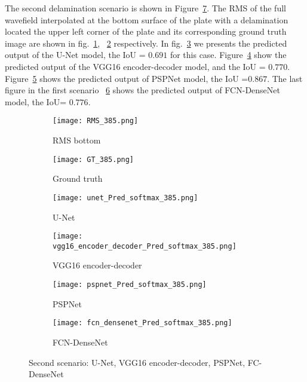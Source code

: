 The second delamination scenario is shown in Figure~\ref{fig:385_softmax}. 
The RMS of the full wavefield interpolated at the bottom surface of the plate with a delamination located the upper left corner of the plate and its corresponding ground truth image are shown in fig.~\ref{fig:RMS_flat_shell_Vz_385}, ~\ref{fig:m1_rand_single_delam_385} respectively. 
In fig.~\ref{fig:Unet_Pred__softmax_385} we presents the predicted output of the U-Net model, the IoU = \(0.691\) for this case.
Figure~\ref{fig:vgg16_pred__softmax_385} show the predicted output of the VGG16 encoder-decoder model, and the IoU = \(0.770\). 
Figure~\ref{fig:pspnet_pred__softmax_385} shows the predicted output of PSPNet model, the IoU =\(0.867\).
The last figure in the first scenario ~\ref{fig:fcn_densenet_pred__softmax_385}	shows the predicted output of FCN-DenseNet model, the IoU= \(0.776\).
\begin{figure}[!h]
	\centering
	\begin{subfigure}[b]{0.47\textwidth}
		\centering
		\texttt{[image: RMS\_385.png]}
		\caption{RMS bottom}
		\label{fig:RMS_flat_shell_Vz_385}
	\end{subfigure}
	\hfill
	\begin{subfigure}[b]{0.47\textwidth}
		\centering
		\texttt{[image: GT\_385.png]}
		\caption{Ground truth}
		\label{fig:m1_rand_single_delam_385}
	\end{subfigure}
	\begin{subfigure}[b]{0.47\textwidth}
		\centering
		\texttt{[image: unet\_Pred\_softmax\_385.png]}
		\caption{U-Net}
		\label{fig:Unet_Pred__softmax_385}
	\end{subfigure}
	\hfill
	\begin{subfigure}[b]{0.47\textwidth}
		\centering
		\texttt{[image: vgg16\_encoder\_decoder\_Pred\_softmax\_385.png]}
		\caption{VGG16 encoder-decoder}			\label{fig:vgg16_pred__softmax_385}			
	\end{subfigure}
	\hfill
	\begin{subfigure}[b]{0.47\textwidth}
		\centering
		\texttt{[image: pspnet\_Pred\_softmax\_385.png]}
		\caption{PSPNet}
		\label{fig:pspnet_pred__softmax_385}
	\end{subfigure}	
	\hfill
	\begin{subfigure}[b]{0.47\textwidth}
		\centering
		\texttt{[image: fcn\_densenet\_Pred\_softmax\_385.png]}
		\caption{FCN-DenseNet}
		\label{fig:fcn_densenet_pred__softmax_385}
	\end{subfigure}	
	\caption{Second scenario: U-Net, VGG16 encoder-decoder, PSPNet, FC-DenseNet}
	\label{fig:385_softmax}
\end{figure}

